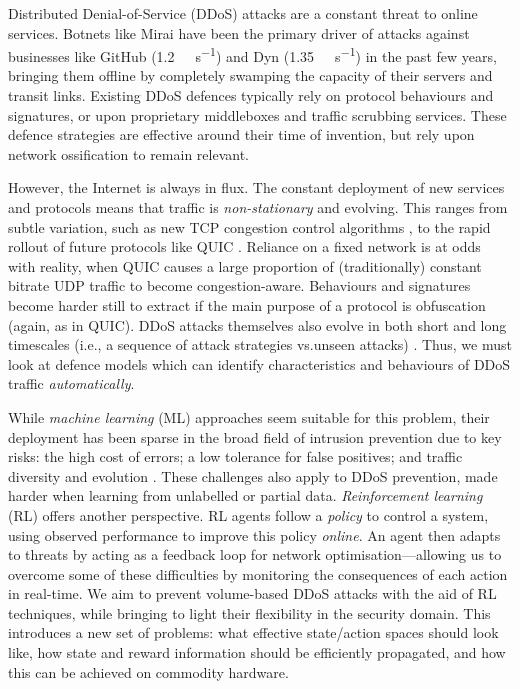 \documentclass[10pt, times, conference, letterpaper]{IEEEtran}
\begin{document}
Distributed Denial-of-Service (DDoS) attacks are a constant threat to online services.
Botnets like Mirai \cite{DBLP:conf/uss/AntonakakisABBB17} have been the primary driver of attacks against businesses like GitHub \cite{github-ddos-2018} (\SI{1.2}{\tera\bit\per\second}) and Dyn \cite{dyn-ddos-2016} (\SI{1.35}{\tera\bit\per\second}) in the past few years, bringing them offline by completely swamping the capacity of their servers and transit links.
Existing DDoS defences typically rely on protocol behaviours and signatures, or upon proprietary middleboxes and traffic scrubbing services.
These defence strategies are effective around their time of invention, but rely upon network ossification to remain relevant.

However, the Internet is always in flux.
The constant deployment of new services and protocols means that traffic is \emph{non-stationary} and evolving.
This ranges from subtle variation, such as new TCP congestion control algorithms \cite{rfc8312}, to the rapid rollout \cite{DBLP:conf/pam/RuthPDH18} of future protocols like QUIC \cite{DBLP:conf/sigcomm/LangleyRWVKZYKS17}.
Reliance on a fixed network is at odds with reality, when QUIC causes a large proportion of (traditionally) constant bitrate UDP traffic to become congestion-aware.
Behaviours and signatures become harder still to extract if the main purpose of a protocol is obfuscation (again, as in QUIC).
DDoS attacks themselves also evolve in both short and long timescales (i.e., a sequence of attack strategies vs.\@ unseen attacks) \cite{DBLP:conf/spw/KangGS16}.
Thus, we must look at defence models which can identify characteristics and behaviours of DDoS traffic \emph{automatically}.

While \emph{machine learning} (ML) approaches seem suitable for this problem, their deployment has been sparse in the broad field of intrusion prevention due to key risks: the high cost of errors; a low tolerance for false positives; and traffic diversity and evolution \cite{DBLP:conf/sp/SommerP10}.
These challenges also apply to DDoS prevention, made harder when learning from unlabelled or partial data.
\emph{Reinforcement learning} (RL) offers another perspective.
RL agents follow a \emph{policy} to control a system, using observed performance to improve this policy \emph{online}.
An agent then adapts to threats by acting as a feedback loop for network optimisation---allowing us to overcome some of these difficulties by monitoring the consequences of each action in real-time.
We aim to prevent volume-based DDoS attacks with the aid of RL techniques, while bringing to light their flexibility in the security domain.
This introduces a new set of problems: what effective state/action spaces should look like, how state and reward information should be efficiently propagated, and how this can be achieved on commodity hardware.
\end{document}
